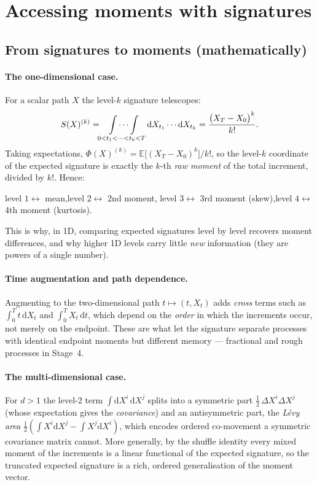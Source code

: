 \documentclass[11pt]{article}
\newcommand{\dd}{\mathrm{d}}
\newcommand{\E}{\mathbb{E}}
\begin{document}
\section{Accessing moments with signatures}\label{sec:moments}
\subsection{From signatures to moments (mathematically)}
\paragraph{The one-dimensional case.}
For a scalar path $X$ the level-$k$ signature telescopes:
\begin{equation}\label{eq:1d}
  S(X)^{(k)}
  = \idotsint\limits_{0<t_1<\cdots<t_k<T}\dd X_{t_1}\cdots\dd X_{t_k}
  = \frac{\big(X_T - X_0\big)^{k}}{k!}.
\end{equation}
Taking expectations,
$\Phi(X)^{(k)} = \E\!\big[(X_T-X_0)^k\big]/k!$, so the level-$k$ coordinate of the
expected signature is exactly the $k$-th \emph{raw moment} of the total increment,
divided by $k!$. Hence:
\begin{center}
level $1\leftrightarrow$ mean,\quad level $2\leftrightarrow$ 2nd moment,\quad
level $3\leftrightarrow$ 3rd moment (skew),\quad level $4\leftrightarrow$ 4th
moment (kurtosis).
\end{center}
This is why, in 1D, comparing expected signatures level by level recovers moment
differences, and why higher 1D levels carry little \emph{new} information (they are
powers of a single number).

\paragraph{Time augmentation and path dependence.}
Augmenting to the two-dimensional path $t\mapsto(t, X_t)$ adds \emph{cross} terms
such as $\int_0^T t\,\dd X_t$ and $\int_0^T X_t\,\dd t$, which depend on the
\emph{order} in which the increments occur, not merely on the endpoint. These are
what let the signature separate processes with identical endpoint moments but
different memory --- fractional and rough processes in Stage~4.

\paragraph{The multi-dimensional case.}
For $d>1$ the level-2 term $\int\dd X^{i}\,\dd X^{j}$ splits into a symmetric part
$\tfrac12\,\Delta X^{i}\Delta X^{j}$ (whose expectation gives the
\emph{covariance}) and an antisymmetric part, the \emph{L\'evy area}
$\tfrac12(\int X^i\dd X^j - \int X^j\dd X^i)$, which encodes ordered co-movement a
symmetric covariance matrix cannot. More generally, by the shuffle identity every
mixed moment of the increments is a linear functional of the expected signature, so
the truncated expected signature is a rich, ordered generalisation of the moment
vector.
\end{document}
